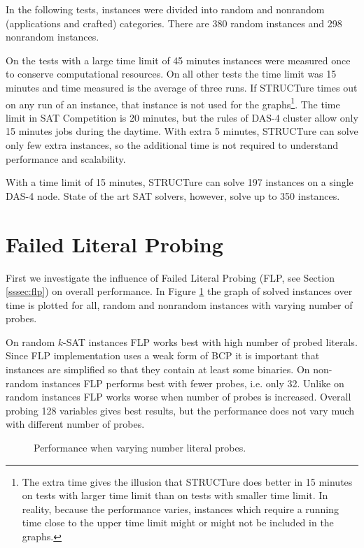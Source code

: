 In the following tests, instances were divided into random and
nonrandom (applications and crafted) categories. There are 380 random
instances and 298 nonrandom instances.

On the tests with a large time limit of 45 minutes instances were
measured once to conserve computational resources. On all other tests
the time limit was 15 minutes and time measured is the average of
three runs.  If STRUCTure times out on any run of an instance,
that instance is not used for the graphs\footnote{The extra
time gives the illusion that STRUCTure does better in 15 minutes on
tests with larger time limit than on tests with smaller time limit.
In reality, because the performance varies, instances which require
a running time close to the upper time limit might or might not
be included in the graphs.}. The time limit in SAT Competition is
20 minutes, but the rules of DAS-4 cluster allow only 15
minutes jobs during the daytime.  With extra 5 minutes, STRUCTure
can solve only few extra instances, so the additional time is not
required to understand performance and scalability.

With a time limit of 15 minutes, STRUCTure can solve 197 instances
on a single DAS-4 node. State of the art SAT solvers, however,
solve up to 350 instances.


\section{Failed Literal Probing}

First we investigate the influence of Failed
Literal Probing (FLP, see Section \ref{sssec:flp}) on overall
performance. In Figure \ref{fig:flp} the graph of solved instances
over time is plotted for all, random and nonrandom instances with
varying number of probes.

On random $k$-SAT instances FLP works best with high number of
probed literals. Since FLP implementation uses a weak form of BCP
it is important that instances are simplified so that they contain
at least some binaries.  On non-random instances FLP performs best
with fewer probes, i.e. only 32.  Unlike on random instances FLP
works worse when number of probes is increased.  Overall probing
128 variables gives best results, but the performance does not vary
much with different number of probes.

\begin{figure}
  \centering
  \caption{Performance when varying number literal probes.}
  \label{fig:flp}
\end{figure}


